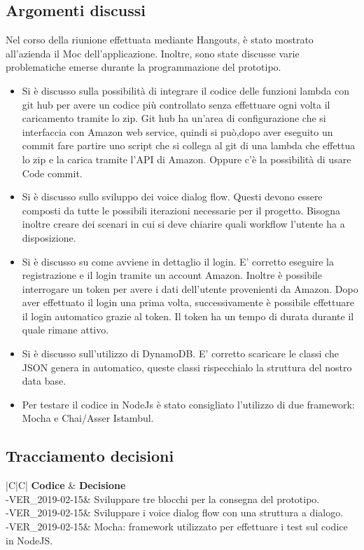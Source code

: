 \documentclass[a4paper,12pt]{article}
\begin{document}
	\subsection{Argomenti discussi}
	Nel corso della riunione effettuata mediante Hangouts, è stato mostrato all'azienda il Moc dell'applicazione.  
	Inoltre, sono state discusse varie problematiche emerse durante la programmazione del prototipo.
	\begin{itemize}
		\item {Si è discusso sulla possibilità di integrare il codice delle funzioni lambda con git hub per avere un codice più controllato senza effettuare ogni volta il caricamento tramite lo zip. Git hub ha  un'area di configurazione che si interfaccia con Amazon web service, quindi si può,dopo aver eseguito un commit fare partire uno script che si collega al git di una lambda che effettua lo zip e la carica tramite l'API di Amazon. Oppure c'è la possibilità di usare Code commit.}
		\item {Si è discusso sullo sviluppo dei voice dialog flow. Questi devono essere composti da tutte le possibili iterazioni necessarie per il progetto. Bisogna inoltre creare dei scenari in cui si deve chiarire quali workflow l'utente ha a disposizione.}
		\item {Si è discusso su come avviene in dettaglio il login. E' corretto eseguire la registrazione e il login tramite un account Amazon. Inoltre è possibile interrogare un token per avere i dati dell'utente provenienti da Amazon. Dopo aver effettuato il login una prima volta, successivamente è possibile effettuare il login automatico grazie al token. Il token ha un tempo di durata durante il quale rimane attivo.}
		\item {Si è discusso sull'utilizzo di DynamoDB. E' corretto scaricare le classi che JSON genera in automatico, queste classi rispecchialo la struttura del nostro data base.}
		\item{Per testare il codice in NodeJs è stato consigliato l'utilizzo di due framework: Mocha e Chai/Asser Istambul.}
	\end{itemize}
	\subsection{Tracciamento decisioni}
	\begin{table}[tbph]
		\centering
		\begin{tabularx}{\textwidth}{|C|C|}
			\hline
			\textbf{Codice } & \textbf{Decisione} \\
			-VER\_2019-02-15& Sviluppare tre blocchi per la consegna del prototipo.\\
			-VER\_2019-02-15& Sviluppare i voice dialog flow con una struttura a dialogo.\\
			-VER\_2019-02-15& Mocha: framework utilizzato per effettuare i test sul codice in NodeJS.\\
			
			\hline
		\end{tabularx}
		\caption{Tracciamento decisioni}
	\end{table}
	\label{LastPage}
\end{document}
